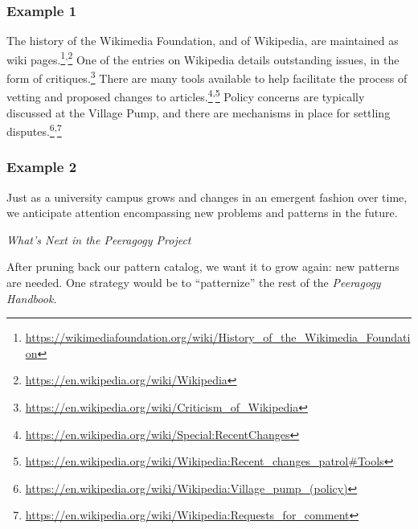\subsubsection*{Example 1} 
The history of the Wikimedia Foundation, and of Wiki\-pedia, are
maintained as wiki
pages.\footnote{\url{https://wikimediafoundation.org/wiki/History_of_the_Wikimedia_Foundation}}\textsuperscript{,}\footnote{\url{https://en.wikipedia.org/wiki/Wikipedia}}
One of the entries on Wikipedia details outstanding issues, in the
form of
critiques.\footnote{\url{https://en.wikipedia.org/wiki/Criticism_of_Wikipedia}}
There are many tools available to help facilitate the process of
vetting and proposed changes to
articles.\footnote{\url{https://en.wikipedia.org/wiki/Special:RecentChanges}}\textsuperscript{,}\footnote{\url{https://en.wikipedia.org/wiki/Wikipedia:Recent_changes_patrol\#Tools}}
Policy concerns are typically discussed at the Village Pump, and there
are mechanisms in place for settling
disputes.\footnote{\url{https://en.wikipedia.org/wiki/Wikipedia:Village_pump_(policy)}}\textsuperscript{,}\footnote{\url{https://en.wikipedia.org/wiki/Wikipedia:Requests_for_comment}}

\subsubsection*{Example 2} 
Just as a university campus grows and changes in an emergent fashion
over time, we anticipate attention encompassing new problems and patterns in the
future.


\begin{framed}
\noindent 
\emph{What's Next in the Peeragogy Project}
\begin{collectinmacro}{\ScrapbookWN}{}{}
After pruning back our pattern catalog, we want it to grow again: new patterns are needed.
One strategy would be to ``patternize'' the rest of the \emph{Peeragogy Handbook.}
\end{collectinmacro}
\ScrapbookWN
\end{framed}


\newpage
